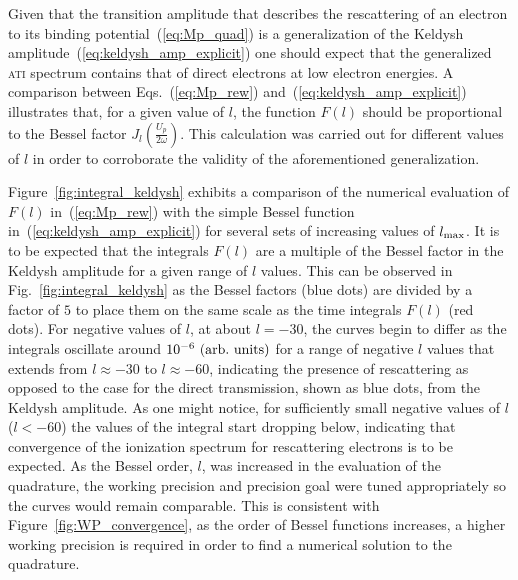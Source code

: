 

Given that the transition amplitude that describes the rescattering of
an electron to its binding potential~(\ref{eq:Mp_quad}) is a
generalization of the Keldysh
amplitude~(\ref{eq:keldysh_amp_explicit}) one should expect that the
generalized \textsc{ati} spectrum contains that of direct electrons at
low electron energies. A comparison between Eqs.~(\ref{eq:Mp_rew})
and~(\ref{eq:keldysh_amp_explicit}) illustrates that, for a given
value of $l$, the function $F(l)$ should be proportional to the Bessel
factor $J_{l}\left( \frac{U_{p}}{2\omega} \right)$. This calculation
was carried out for different values of $l$ in order to corroborate
the validity of the aforementioned generalization.

Figure~\ref{fig:integral_keldysh} exhibits a comparison of the
numerical evaluation of $F(l)$ in~(\ref{eq:Mp_rew}) with the simple
Bessel function in~(\ref{eq:keldysh_amp_explicit}) for several sets of
increasing values of $l_{\rm{max}}$. It is to be expected that the
integrals $F(l)$ are a multiple of the Bessel factor in the Keldysh
amplitude for a given range of $l$ values. This can be observed in
Fig.~\ref{fig:integral_keldysh} as the Bessel factors (blue dots) are
divided by a factor of $5$ to place them on the same scale as the time
integrals $F(l)$ (red dots). For negative values of $l$, at about
$l=-30$, the curves begin to differ as the integrals oscillate around
$10^{-6}\ \rm{(arb.\ units)}$ for a range of negative $l$ values that
extends from $l\approx -30$ to $l\approx -60$, indicating the presence
of rescattering as opposed to the case for the direct transmission,
shown as blue dots, from the Keldysh amplitude. As one might notice,
for sufficiently small negative values of $l$ ($l < -60$) the values
of the integral start dropping below, indicating that convergence of
the ionization spectrum for rescattering electrons is to be
expected. As the Bessel order, $l$, was increased in the evaluation of
the quadrature, the working precision and precision goal were tuned
appropriately so the curves would remain comparable. This is
consistent with Figure~\ref{fig:WP_convergence}, as the order of
Bessel functions increases, a higher working precision is required in
order to find a numerical solution to the quadrature.


